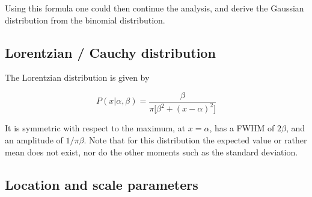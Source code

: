 \documentclass[a4paper]{article}
\begin{document}
Using this formula one could then continue the analysis, and derive the Gaussian distribution from the binomial distribution.

\subsection{Lorentzian / Cauchy distribution}

The Lorentzian distribution is given by

\begin{equation}
	P(x|\alpha, \beta)=\frac{\beta}{\pi\big[\beta^2+(x-\alpha)^2\big]}
\end{equation}

It is symmetric with respect to the maximum, at $x=\alpha$, has a FWHM of $2\beta$, and an amplitude of $1/\pi\beta$. Note that for this distribution the expected value or rather mean does not exist, nor do the other moments such as the standard deviation.

\subsection{Location and scale parameters}
\end{document}
